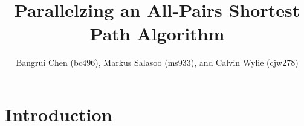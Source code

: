 \documentclass[11pt]{article}
\title{Parallelzing an All-Pairs Shortest Path Algorithm}
\author{Bangrui Chen (bc496), Markus Salasoo (ms933), and Calvin Wylie (cjw278)}
\begin{document}
\maketitle

\section*{Introduction}
\end{document}
